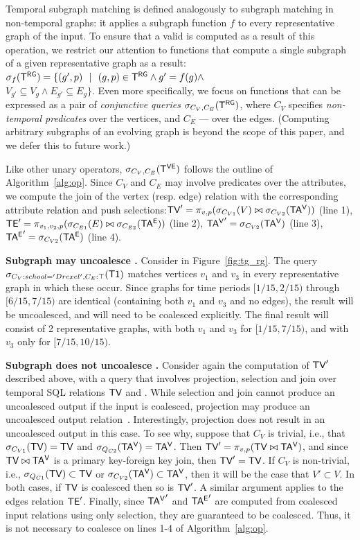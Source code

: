 Temporal subgraph matching is defined analogously to subgraph matching
in non-temporal graphs: it applies a subgraph function $f$ to every
representative graph of the input.  To ensure that a valid \tg is
computed as a result of this operation, we restrict our attention to
functions that compute a single subgraph of a given representative
graph as a result: $\sigma_f (\mathsf{T^{RG}}) = \{ (g', p)~~|~~(g, p) \in \mathsf{T^{RG}}
\wedge g' = f(g) \wedge$\\$V_{g'} \subseteq V_{g} \wedge E_{g'}
\subseteq E_{g} \}$. Even more specifically, we focus on functions
that can be expressed as a pair of {\em conjunctive queries}
$\sigma_{C_V,C_E} (\mathsf{T^{RG}})$, where $C_V$ specifies {\em non-temporal
  predicates} over the vertices, and $C_E$ --- over the
edges. (Computing arbitrary subgraphs of an evolving graph is beyond
the scope of this paper, and we defer this to future work.)

Like other unary operators, $\sigma_{C_V, C_E} (\mathsf{T^{VE}})$ follows the
outline of Algorithm~\ref{alg:op}.  Since $C_V$ and $C_E$ may involve
predicates over the attributes, we compute the join of the vertex
(resp. edge) relation with the corresponding attribute relation and
push selections:$\textsf{TV}' = \pi_{v,p} (\sigma_{C_{V1}} (V) \bowtie
\sigma_{C_{V2}} (\mathsf{TA^{V}}))$ (line 1),$\textsf{TE}' = \pi_{v_1,v_2,p}
(\sigma_{C_{E1}} (E) \bowtie \sigma_{C_{E2}} (\mathsf{TA^{E}}))$ (line 2), $\mathsf{TA^{V}}'
= \sigma_{C_{V2}} (\mathsf{TA^{V}})$ (line 3), $\mathsf{TA^{E}}' = \sigma_{C_{V2}} (\mathsf{TA^{E}})$
(line 4).

{\bf Subgraph may uncoalesce \trg.} Consider  in
Figure~\ref{fig:tg_rg}.  The query
$\sigma_{C_V:{school='Drexel'},C_E:\top} (\textsf{T1})$ matches
vertices $v_1$ and $v_3$ in every representative graph in which these
occur.  Since graphs for time periods $[1/15,2/15)$ through
  $[6/15,7/15)$ are identical (containing both $v_1$ and $v_3$ and no
    edges), the result will be uncoalesced, and will need to be
    coalesced explicitly.  The final result will consist of 2
    representative graphs, with both $v_1$ and $v_3$ for $[1/15,
      7/15)$, and with $v_3$ only for $[7/15, 10/15)$.

{\bf Subgraph does not uncoalesce \tve.}  Consider again the
computation of $\textsf{TV}'$ described above, with a query that involves
projection, selection and join over temporal SQL relations $\textsf{TV}$ and
\tav.  While selection and join cannot produce an uncoalesced output
if the input is coalesced, projection may produce an uncoalesced
output relation~\cite{DBLP:conf/vldb/BohlenSS96}.  Interestingly,
projection does not result in an uncoalesced output in this case. To
see why, suppose that $C_V$ is trivial, i.e., that $\sigma_{C_{V1}}
(\textsf{TV}) = \textsf{TV}$ and $\sigma_{Q_{C2}} (\mathsf{TA^{V}}) = \mathsf{TA^{V}}$. Then $\textsf{TV}' =
\pi_{v,p} (\textsf{TV} \bowtie \mathsf{TA^{V}})$, and since $\textsf{TV} \bowtie \mathsf{TA^{V}}$ is a
primary key-foreign key join, then $\textsf{TV}' = \textsf{TV}$.  If $C_V$ is
non-trivial, i.e., $\sigma_{Q_{C1}} (\textsf{TV}) \subset \textsf{TV}$ or
$\sigma_{C_{V2}} (\mathsf{TA^{V}}) \subset \mathsf{TA^{V}}$, then it will be the case that
$V' \subset V$.  In both cases, if $\textsf{TV}$ is coalesced then so is
$\textsf{TV}'$.  A similar argument applies to the edges relation $\textsf{TE}'$.
Finally, since $\mathsf{TA^{V}}'$ and $\mathsf{TA^{E}}'$ are computed from coalesced input
relations using only selection, they are guaranteed to be coalesced.
Thus, it is not necessary to coalesce on lines 1-4 of
Algorithm~\ref{alg:op}.

